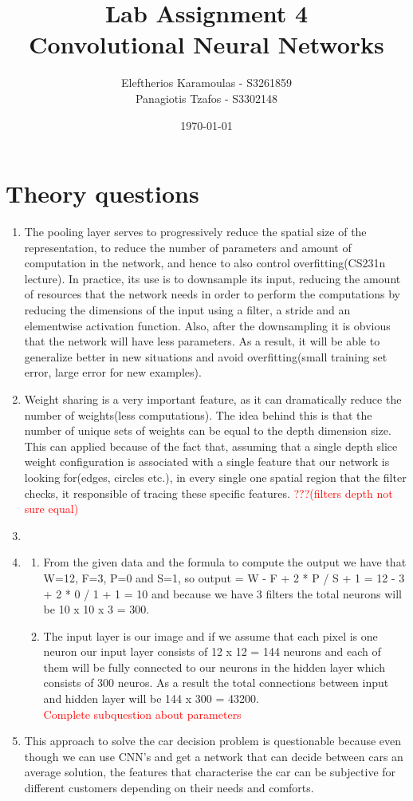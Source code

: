 \documentclass{article}
\title{Lab Assignment 4\\ {\Large Convolutional Neural Networks}}
\date{\today}
\author{
 	Eleftherios Karamoulas - S3261859\\ 
	Panagiotis Tzafos - S3302148\\
}
\begin{document}
\maketitle
\section{Theory questions}
\begin{enumerate}
\item The pooling layer serves to progressively reduce the spatial size of the representation, to reduce the number of parameters and amount of computation in the network, and hence to also control overfitting(CS231n lecture). In practice, its use is to downsample its input, reducing the amount of resources that the network needs in order to perform the computations by reducing the dimensions of the input using a filter, a stride and an elementwise activation function. Also, after the downsampling it is obvious that the network will have less parameters. As a result, it will be able to generalize better in new situations and avoid overfitting(small training set error, large error for new examples). 
\item
Weight sharing is a very important feature, as it can dramatically reduce the number of weights(less computations). The idea behind this is that the number of unique sets of weights can be equal to the depth dimension size. This can applied because of the fact that, assuming that a single depth slice weight configuration is associated with a single feature that our network is looking for(edges, circles etc.), in every single one spatial region that the filter checks, it responsible of tracing these specific features. \textcolor{red}{???(filters depth not sure equal)}
\item
\item
\begin{enumerate}
\item From the given data and the formula to compute the output we have that W=12, F=3, P=0 and S=1, so output = W - F + 2 * P / S + 1 = 12 - 3 + 2 * 0 / 1 + 1 =  10 and because we have 3 filters the total neurons will be 10 x 10 x 3 = 300.\\
\item
 The input layer is our image and if we assume that  each pixel is one neuron our input layer consists of 12 x 12 = 144 neurons and each of them will be fully connected to our neurons in the hidden layer which consists of 300 neuros. As a result the total connections between input and hidden layer will be 144 x 300 = 43200.\\
\textcolor{red}{Complete subquestion about parameters}
\end{enumerate}
\item This approach to solve the car decision problem is questionable because even though we can use CNN's and get a network that can decide between cars an average solution, the features that characterise the car can be subjective for different customers depending on their needs and comforts.
\end{enumerate}
\setcounter{section}{+3}
\end{document}
